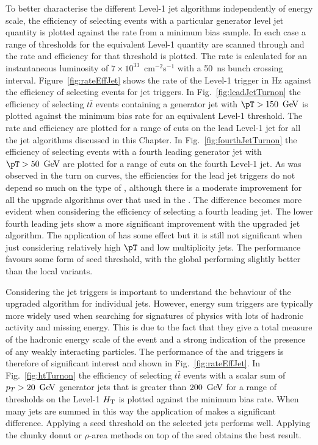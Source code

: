 To better characterise the different Level-1 jet algorithms independently of energy
scale, the efficiency of selecting events with a particular generator
level jet quantity is plotted against the rate from a minimum bias
sample. In each case a range of thresholds for the equivalent Level-1
quantity are scanned through and the rate and efficiency for that
threshold is plotted. The rate is calculated for an instantaneous luminosity
of $7\times10^{33}$~cm$^{-2}$s$^{-1}$ with a 50~ns \LHC bunch crossing
interval. Figure~\ref{fig:rateEffJet} shows the rate of the Level-1
trigger in Hz against the efficiency of selecting events for jet
triggers. In Fig.~\ref{fig:leadJetTurnon} the efficiency of
selecting $t\bar{t}$ events containing a generator jet with
$\pT>150~\gev$ is plotted against the minimum bias rate for an
equivalent Level-1 threshold. The rate and efficiency are plotted for
a range of cuts on the lead Level-1 jet for all the jet algorithms
discussed in this Chapter. In Fig.~\ref{fig:fourthJetTurnon} the
efficiency of selecting events with a fourth leading generator jet
with $\pT>50~\gev$ are plotted for a range of cuts on the fourth Level-1
jet. As was observed in the turn on curves, the efficiencies for the
lead jet triggers do not depend so much on the type of \PUS, although
there is a moderate improvement for all the upgrade algorithms over
that used in the \GCT. The difference becomes more evident when
considering the efficiency of selecting a fourth leading jet. The
lower \pT fourth leading jets show a more significant improvement with
the upgraded jet algorithm. The application of \PUS has some effect
but it is still not significant when just considering relatively high
$\pT$ and low multiplicity jets. The performance favours some form of
seed threshold, with the global \PUS performing slightly better than
the local variants.

Considering the jet triggers is important to understand the
behaviour of the upgraded algorithm for individual jets. However,
energy sum triggers are typically more widely used when searching for
signatures of \BSM physics with lots of hadronic activity and missing
energy. This is due to the fact that they give a total measure of the
hadronic energy scale of the event and a strong indication of the
presence of any weakly interacting particles. The performance of the
\HT and \MHT triggers is therefore of significant interest and shown
in Fig.~\ref{fig:rateEffJet}. In Fig.~\ref{fig:htTurnon} the
efficiency of selecting $t\bar{t}$ events with a scalar sum of $p_T>20~\mathrm{\,Ge\kern -0.1em V}$
generator jets that is greater than $200~\mathrm{\,Ge\kern -0.1em V}$ for a range of
thresholds on the Level-1 $\mbox{$H_\text{T}$}$ is plotted against the minimum bias
rate. When many jets are summed in this way the application of \PUS
makes a significant difference. Applying a seed threshold on the
selected jets performs well. Applying the chunky donut or
$\rho$-area \PUS methods on top of the seed obtains the best result.

